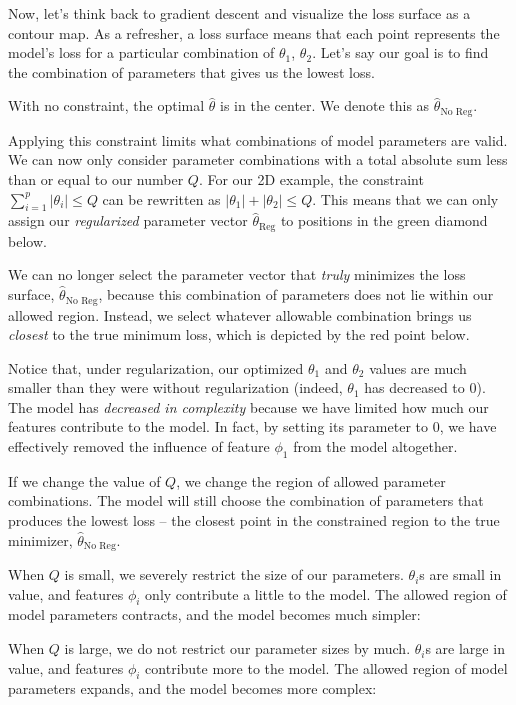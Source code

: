 \documentclass[
  letterpaper,
  DIV=11,
  numbers=noendperiod]{scrreprt}
\begin{document}
Now, let's think back to gradient descent and visualize the loss surface
as a contour map. As a refresher, a loss surface means that each point
represents the model's loss for a particular combination of
\(\theta_1\), \(\theta_2\). Let's say our goal is to find the
combination of parameters that gives us the lowest loss.

With no constraint, the optimal \(\hat{\theta}\) is in the center. We
denote this as \(\hat{\theta}_\text{No Reg}\).

Applying this constraint limits what combinations of model parameters
are valid. We can now only consider parameter combinations with a total
absolute sum less than or equal to our number \(Q\). For our 2D example,
the constraint \(\sum_{i=1}^p |\theta_i| \leq Q\) can be rewritten as
\(|\theta_1| + |\theta_2| \leq Q\). This means that we can only assign
our \emph{regularized} parameter vector \(\hat{\theta}_{\text{Reg}}\) to
positions in the green diamond below.

We can no longer select the parameter vector that \emph{truly} minimizes
the loss surface, \(\hat{\theta}_{\text{No Reg}}\), because this
combination of parameters does not lie within our allowed region.
Instead, we select whatever allowable combination brings us
\emph{closest} to the true minimum loss, which is depicted by the red
point below.

Notice that, under regularization, our optimized \(\theta_1\) and
\(\theta_2\) values are much smaller than they were without
regularization (indeed, \(\theta_1\) has decreased to 0). The model has
\emph{decreased in complexity} because we have limited how much our
features contribute to the model. In fact, by setting its parameter to
0, we have effectively removed the influence of feature \(\phi_1\) from
the model altogether.

If we change the value of \(Q\), we change the region of allowed
parameter combinations. The model will still choose the combination of
parameters that produces the lowest loss -- the closest point in the
constrained region to the true minimizer,
\(\hat{\theta}_{\text{No Reg}}\).

When \(Q\) is small, we severely restrict the size of our parameters.
\(\theta_i\)s are small in value, and features \(\phi_i\) only
contribute a little to the model. The allowed region of model parameters
contracts, and the model becomes much simpler:

When \(Q\) is large, we do not restrict our parameter sizes by much.
\(\theta_i\)s are large in value, and features \(\phi_i\) contribute
more to the model. The allowed region of model parameters expands, and
the model becomes more complex:
\end{document}
